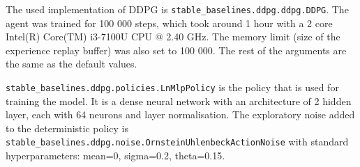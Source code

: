 \documentclass[class=book, crop=false, 11pt]{standalone}
\begin{document}
The used implementation of DDPG is \texttt{stable\_baselines.ddpg.ddpg.DDPG}. The agent was trained for 100 000 steps, which took around 1 hour with a 2 core Intel(R) Core(TM) i3-7100U CPU @ 2.40 GHz. The memory limit (size of the experience replay buffer) was also set to 100 000. The rest of the arguments are the same as the default values. 

\texttt{stable\_baselines.ddpg.policies.LnMlpPolicy} is the policy that is used for training the model. It is a dense neural network with an architecture of 2 hidden layer, each with 64 neurons and layer normalisation. The exploratory noise added to the deterministic policy is \texttt{stable\_baselines.ddpg.noise.OrnsteinUhlenbeckActionNoise} with standard hyperparameters: mean=0, sigma=0.2, theta=0.15.  
\end{document}
